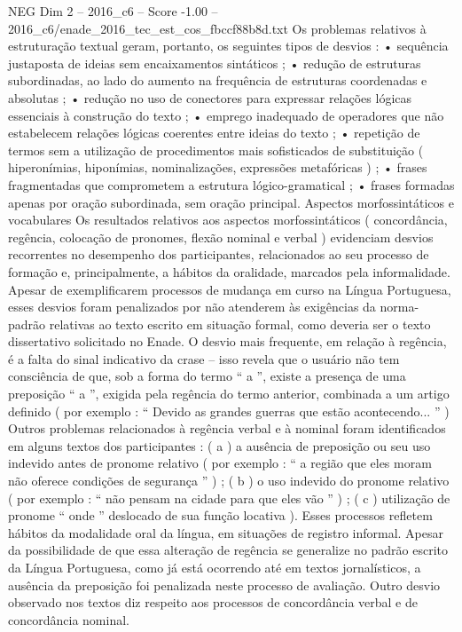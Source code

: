 \begin{textsample}{NEG Dim 2 – 2016\_c6 – Score -1.00 – 2016\_c6/enade\_2016\_tec\_est\_cos\_fbccf88b8d.txt}
Os problemas relativos à estruturação textual geram, portanto, os seguintes tipos de desvios : • sequência justaposta de ideias sem encaixamentos sintáticos ; • redução de estruturas subordinadas, ao lado do aumento na frequência de estruturas coordenadas e absolutas ; • redução no uso de conectores para expressar relações lógicas essenciais à construção do texto ; • emprego inadequado de operadores que não estabelecem relações lógicas coerentes entre ideias do texto ; • repetição de termos sem a utilização de procedimentos mais sofisticados de substituição ( hiperonímias, hiponímias, nominalizações, expressões metafóricas ) ; • frases fragmentadas que comprometem a estrutura lógico-gramatical ; • frases formadas apenas por oração subordinada, sem oração principal.
Aspectos morfossintáticos e vocabulares Os resultados relativos aos aspectos morfossintáticos ( concordância, regência, colocação de pronomes, flexão nominal e verbal ) evidenciam desvios recorrentes no desempenho dos participantes, relacionados ao seu processo de formação e, principalmente, a hábitos da oralidade, marcados pela informalidade.
Apesar de exemplificarem processos de mudança em curso na Língua Portuguesa, esses desvios foram penalizados por não atenderem às exigências da norma-padrão relativas ao texto escrito em situação formal, como deveria ser o texto dissertativo solicitado no Enade.
O desvio mais frequente, em relação à regência, é a falta do sinal indicativo da crase – isso revela que o usuário não tem consciência de que, sob a forma do termo “ a ”, existe a presença de uma preposição “ a ”, exigida pela regência do termo anterior, combinada a um artigo definido ( por exemplo : “ Devido as grandes guerras que estão acontecendo... ” ) Outros problemas relacionados à regência verbal e à nominal foram identificados em alguns textos dos participantes : ( a ) a ausência de preposição ou seu uso indevido antes de pronome relativo ( por exemplo : “ a região que eles moram não oferece condições de segurança ” ) ; ( b ) o uso indevido do pronome relativo ( por exemplo : “ não pensam na cidade para que eles vão ” ) ; ( c ) utilização de pronome “ onde ” deslocado de sua função locativa ).
Esses processos refletem hábitos da modalidade oral da língua, em situações de registro informal.
Apesar da possibilidade de que essa alteração de regência se generalize no padrão escrito da Língua Portuguesa, como já está ocorrendo até em textos jornalísticos, a ausência da preposição foi penalizada neste processo de avaliação.
Outro desvio observado nos textos diz respeito aos processos de concordância verbal e de concordância nominal.

\end{textsample}
